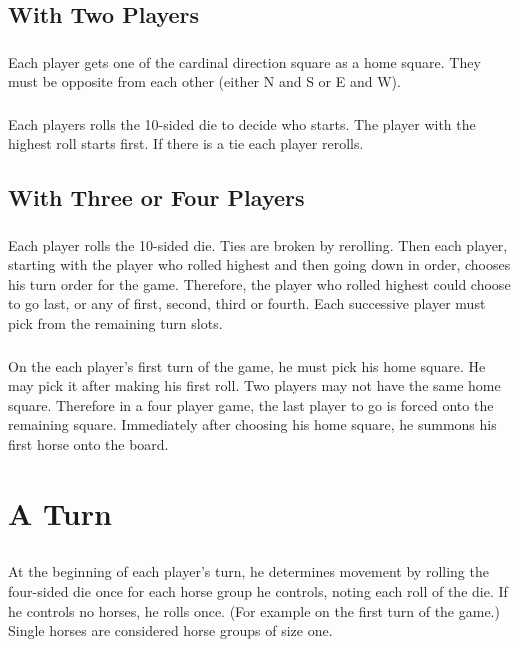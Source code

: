 \documentclass[12pt]{article} %
\begin{document}
\subsection{With Two Players}

\subsubsection{}
Each player gets one of the cardinal direction square as a home square.  They must be opposite from each other (either N and S or E and W).  

\subsubsection{}
Each players rolls the 10-sided die to decide who starts.  The player with the highest roll starts first.  If there is a tie each player rerolls.

\subsection{With Three or Four Players}

\subsubsection{}
Each player rolls the 10-sided die.  Ties are broken by rerolling.  Then each player, starting with the player who rolled highest and then going down in order, chooses his turn order for the game.  Therefore, the player who rolled highest could choose to go last, or any of first, second, third or fourth.  Each successive player must pick from the remaining turn slots.

\subsubsection{}
On the each player's first turn of the game, he must pick his home square.  He may pick it after making his first roll.  Two players may not have the same home square.  Therefore in a four player game, the last player to go is forced onto the remaining square.  Immediately after choosing his home square, he summons his first horse onto the board.


\section{A Turn}

\subsection{}
At the beginning of each player's turn, he determines movement by rolling the four-sided die once for each horse group he controls, noting each roll of the die.  If he controls no horses, he rolls once. (For example on the first turn of the game.)  Single horses are considered horse groups of size one.
\end{document}
